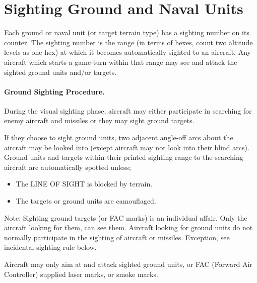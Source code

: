 
\section{Sighting Ground and Naval Units}
\label{rule:sighting-ground-and-naval-units}

Each ground or naval unit (or target terrain type) has a sighting number on its counter. The sighting number is the range (in terms of hexes, count two altitude levels as one hex) at which it becomes automatically sighted to an aircraft. Any aircraft which starts a game-turn within that range may see and attack the sighted ground units and/or targets.

\paragraph{Ground Sighting Procedure.} During the visual sighting phase, aircraft may either participate in searching for enemy aircraft and missiles or they may sight ground targets.

If they choose to sight ground units, two adjacent angle-off arcs about the aircraft may be looked into (except aircraft may not look into their blind arcs). Ground units and targets within their printed sighting range to the searching aircraft are automatically spotted unless;

\begin{itemize}
    \item The LINE OF SIGHT is blocked by terrain.
    \item The targets or ground units are camouflaged.
\end{itemize}

Note: Sighting ground targets (or FAC marks) is an individual affair. Only the aircraft looking for them, can see them. Aircraft looking for ground units do not normally participate in the sighting of aircraft or missiles. Exception, see incidental sighting rule below.

Aircraft may only aim at and attack sighted ground units, or FAC (Forward Air Controller) supplied laser marks, or smoke marks.

